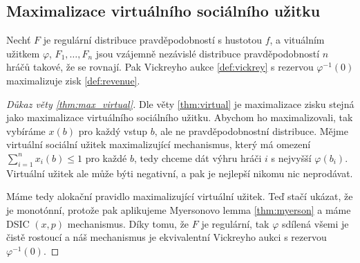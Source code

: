 \subsection{Maximalizace virtuálního sociálního užitku}
\begin{theorem}\label{thm:max_virtual}
  Nechť $F$ je regulární distribuce pravděpodobností s hustotou $f$, a vituálním užitkem $\varphi$, $F_1, \dots,F_n$ jsou vzájemně nezávislé distribuce pravděpodobností $n$ hráčů takové, že se rovnají. 
  Pak Vickreyho aukce \ref{def:vickrey} s rezervou $\varphi^{-1} (0)$ maximalizuje zisk \ref{def:revenue}. 
\end{theorem}
\begin{proof}[Důkaz věty \ref{thm:max_virtual}]
    Dle věty \ref{thm:virtual} je maximalizace zisku stejná jako maximalizace virtuálního sociálního užitku.
    Abychom ho maximalizovali, tak vybíráme $x(b)$ pro každý vstup $b$, ale ne pravděpodobnostní distribuce. 
    Mějme virtuální sociální užitek maximalizující mechanismus, který má omezení $\sum^n_{i=1}x_i(b) \leq 1$ pro každé $b$, tedy chceme dát výhru hráči $i$ s nejvyšší $\varphi(b_i)$. 
    Virtuální užitek ale může býti negativní, a pak je nejlepší nikomu nic neprodávat. 

    Máme tedy alokační pravidlo maximalizující virtuální užitek. 
    Teď stačí ukázat, že je monotónní, protože pak aplikujeme Myersonovo lemma \ref{thm:myerson} a máme DSIC $(x,p)$ mechanismus. 
    Díky tomu, že $F$ je regulární, tak $\varphi$ sdílená všemi je čistě rostoucí a náš mechanismus je ekvivalentní Vickreyho aukci s rezervou $\varphi^{-1}(0)$. 
\end{proof}
